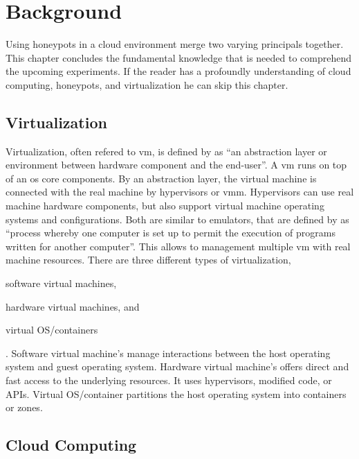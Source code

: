 \chapter{Background}

Using honeypots in a cloud environment merge two varying principals together.
This chapter concludes the fundamental knowledge that is needed to comprehend the upcoming experiments.
If the reader has a profoundly understanding of cloud computing, honeypots, and virtualization he can skip this chapter.

\section{Virtualization}

Virtualization, often refered to \ac{vm}, is defined by \citet{kreuter2004} as \enquote{an abstraction layer or environment between hardware component and the end-user}.
A \ac{vm} runs on top of an \ac{os} core components.
By an abstraction layer, the virtual machine is connected with the real machine by hypervisors or \ac{vmm}.
Hypervisors can use real machine hardware components, but also support virtual machine operating systems and configurations.
Both are similar to emulators, that are defined by \citet{lichstei1969} as \enquote{process whereby one computer is set up to permit the execution of programs written for another computer}.
This allows to management multiple \ac{vm} with real machine resources.
There are three different types of virtualization,
\begin{enumerate*}[label=(\roman*)]
    \item software virtual machines,
    \item hardware virtual machines, and
    \item virtual OS/containers
\end{enumerate*}.
Software virtual machine's manage interactions between the host operating system and guest operating system.
Hardware virtual machine's offers direct and fast access to the underlying resources.
It uses hypervisors, modified code, or APIs.
Virtual OS/container partitions the host operating system into containers or zones.
\cite{daniels2009}

\section{Cloud Computing}
\label{sec:cloud-computing}

